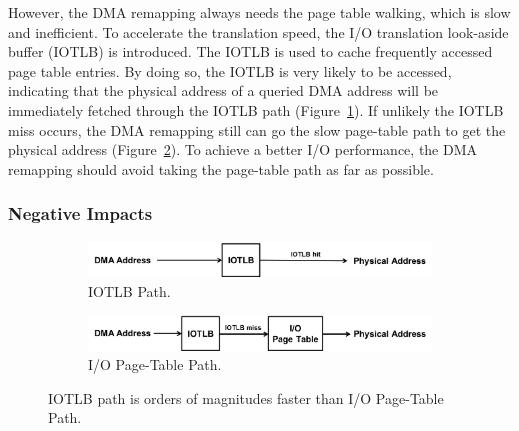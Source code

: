 However, the DMA remapping always needs the page table walking, which is slow and inefficient.
To accelerate the translation speed, the I/O translation look-aside buffer (IOTLB) is introduced.
The IOTLB is used to cache frequently accessed page table entries.
By doing so, the IOTLB is very likely to be accessed, indicating that the physical address of a queried DMA address will be immediately fetched through the IOTLB path (Figure~\ref{fig:subfig:a}).
If unlikely the IOTLB miss occurs, the DMA remapping still can go the slow page-table path to get the physical address (Figure~\ref{fig:subfig:b}).
To achieve a better I/O performance, the DMA remapping should avoid taking the page-table path as far as possible.

\subsubsection{Negative Impacts}

\begin{figure}[!t]
    \begin{subfigure}{0.5\textwidth}
        \includegraphics[width=1\textwidth]{image/background/DMA-IOTLB-translation.png}
        \caption{\centering IOTLB Path.}
        \label{fig:subfig:a}
    \end{subfigure}%
    \vfill \vfill \vfill \vfill
    \begin{subfigure}{0.5\textwidth}
        \includegraphics[width=1\textwidth]{image/background/DMA-pt-translation.png}
        \caption{\centering I/O Page-Table Path.}
        \label{fig:subfig:b}
    \end{subfigure}
    \caption{IOTLB path is orders of magnitudes faster than I/O Page-Table Path.}
    \label{fig:dma-add-trans}
\end{figure}

